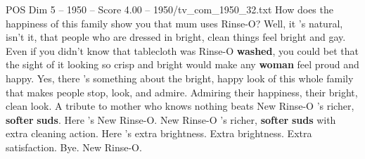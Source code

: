 \begin{textsample}{POS Dim 5 – 1950 – Score 4.00 – 1950/tv\_com\_1950\_32.txt}  \label{ex:f5_pos_047}
How does the happiness of this family show you that mum uses Rinse-O?
Well, it 's natural, isn't it, that people who are dressed in bright, clean things feel bright and gay.
Even if you didn't know that tablecloth was Rinse-O \textbf{washed}, you could bet that the sight of it looking so crisp and bright would make any \textbf{woman} feel proud and happy.
Yes, there 's something about the bright, happy look of this whole family that makes people stop, look, and admire.
Admiring their happiness, their bright, clean look.
A tribute to mother who knows nothing beats New Rinse-O 's richer, \textbf{softer} \textbf{suds}.
Here 's New Rinse-O.
New Rinse-O 's richer, \textbf{softer} \textbf{suds} with extra cleaning action.
Here 's extra brightness.
Extra brightness.
Extra satisfaction.
Bye.
New Rinse-O.

\end{textsample}
